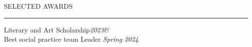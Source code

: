 \documentclass{resume} %
\renewenvironment{rSection}[1]{
\sectionskip
\textcolor{TsinghuaPurple}{\MakeUppercase{#1}}
\sectionlineskip
\hrule
\begin{list}{}{
\setlength{\leftmargin}{0em}
}
\item[]
}{
\end{list}
}
\begin{document}


\begin{rSection}{Selected awards} \itemsep -2pt
{Literary and Art Scholarship}\hfill {\em 2023\;\&} \\
{Best social practice team Leader} \hfill {\em Spring 2024}
\end{rSection}
\end{document}
